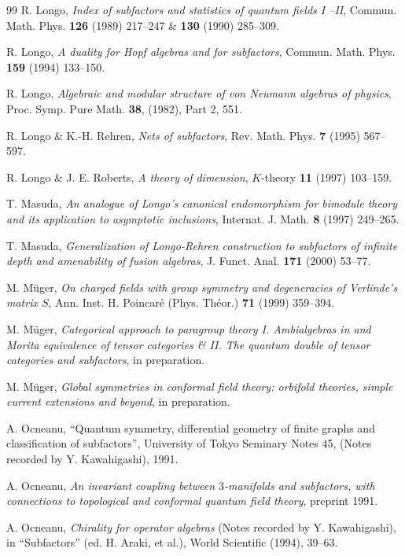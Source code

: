 \documentclass[12pt]{article}
\begin{document}
{\begin{thebibliography}{99}
 R. Longo, {\it Index of subfactors and statistics of 
quantum fields I --II}, Commun.  Math.  Phys.  {\bf 126} (1989) 
217--247 \& {\bf 130} (1990) 285--309.

R. Longo, {\it A duality for Hopf algebras and for
subfactors}, Commun. Math. Phys. {\bf 159} (1994) {133--150.}

 R. Longo, {\it Algebraic and modular structure 
of von Neumann algebras of physics}, Proc. Symp. Pure Math.
{\bf 38}, (1982), Part 2, 551.

R. Longo \& K.-H. Rehren, {\it Nets of subfactors}, Rev.  Math.  Phys.  
{\bf 7} (1995) 567--597.

R. Longo \& J. E. Roberts, {\it A theory of dimension}, $K$-theory 
{\bf 11} (1997) 103--159.

T. Masuda,
{\it An analogue of Longo's canonical endomorphism for
bimodule theory and its application to asymptotic inclusions},
Internat. J. Math.  {\bf 8} (1997) 249--265.

T. Masuda,
{\it Generalization of Longo-Rehren construction to subfactors of
infinite depth and amenability of fusion algebras}, 
J. Funct. Anal. {\bf 171} (2000) 53--77.

M. M\"uger, {\it On charged fields with group symmetry and 
degeneracies of Verlinde's matrix $S$}, Ann.  Inst.  H. Poincar\'e 
(Phys.  Th\'eor.)  {\bf 71} (1999) 359--394.

M. M\"uger, {\it Categorical approach to paragroup theory I. 
Ambialgebras in and Morita equivalence of tensor categories \& II. The 
quantum double of tensor categories and subfactors}, in preparation.

M. M\"uger, {\it Global symmetries in conformal field theory: orbifold 
theories, simple current extensions and beyond}, in preparation.

  A. Ocneanu,
``Quantum symmetry, differential geometry of finite graphs and
classification of subfactors'', University of Tokyo Seminary Notes 45,
(Notes recorded by Y. Kawahigashi), 1991.

  A. Ocneanu,
{\it An invariant coupling between $3$-manifolds and subfactors,
with connections to topological and conformal quantum field
theory}, preprint 1991.

 A. Ocneanu, {\it Chirality for operator algebras} (Notes 
recorded by Y. Kawahigashi), in ``Subfactors'' (ed.  H. Araki, et 
al.), World Scientific (1994), 39--63.


\end{thebibliography}}
\end{document}
